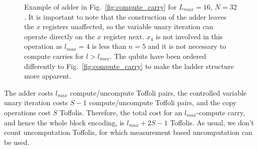 \documentclass[aps,prx,twocolumn,floatfix,10pt,amssymb,amsfont,amsmath,superscriptaddress,float,nofootinbib,longbibliography,nobalancelastpage]{revtex4-2}
\theoremstyle{empty}
\begin{document}
\begin{figure}
\caption{\label{fig:adder}Example of adder in Fig.~\ref{fig:compute_carry} for $L_{max} = 16$, $N=32$. It is important to note that the construction of the adder leaves the $x$ registers unaffected, so the variable unary iteration can operate directly on the $x$ register next. $x_4$ is not involved in this operation as $l_{max}=4$ is less than $n=5$ and it is not necessary to compute carries for $l > l_{max}$. The qubits have been ordered differently to Fig.~\ref{fig:compute_carry} to make the ladder structure more apparent.}
\end{figure}

The adder costs $l_{max}$ compute/uncompute Toffoli pairs, the controlled variable unary iteration costs $S-1$ compute/uncompute Toffoli pairs, and the copy operations cost $S$ Toffolis.  Therefore, the total cost for an $l_{max}$-compute carry, and hence the whole block encoding, is $l_{max} + 2S - 1$ Toffolis. As usual, we don't count uncomputation Toffolis, for which measurement based uncomputation can be used.
\end{document}
